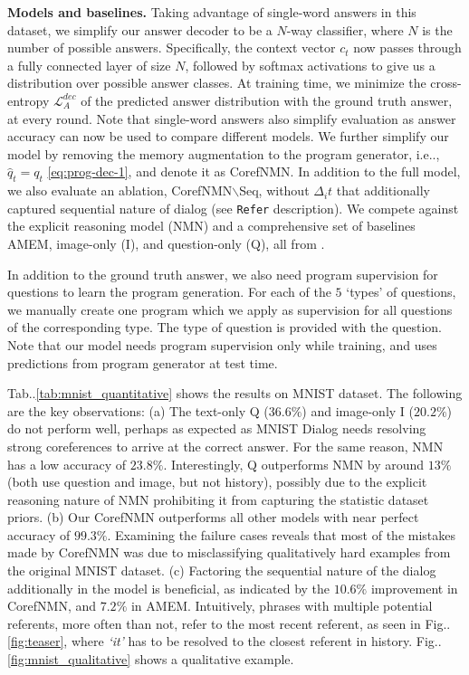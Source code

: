 \documentclass[runningheads]{llncs}
\makeatletter
\DeclareRobustCommand\onedot{\futurelet\@let@token\@onedot}
\def\@onedot{\ifx\@let@token.\else.\null\fi\xspace}
\def\ie{i.e\onedot} \def\Ie{I.e\onedot}
\def\Fig{Fig\onedot}
\def\Table{Tab\onedot}
\newcommand{\nmn}{CorefNMN\xspace}
\newcommand{\myparagraph}[1]{\vspace{0pt}\noindent{\bf #1}}
\makeatother
\begin{document}
\noindent
\textbf{Models and baselines.}
Taking advantage of single-word answers in this dataset, 
we simplify our answer decoder to be a $N$-way classifier, where $N$ is the number of possible answers.
Specifically, the context vector $c_t$ now passes through
a fully connected layer of size $N$, followed by softmax activations to give
us a distribution over possible answer classes.
At training time, we minimize the cross-entropy $\mathcal{L}_A^{dec}$ of the 
predicted answer distribution with the ground truth answer, at every round.
Note that single-word answers also simplify evaluation as answer accuracy can 
now be used to compare different models.
We further simplify our model by removing the memory augmentation to the
program generator, \ie, $\hat{q}_t = q_t$ \eqref{eq:prog-dec-1}, and denote it
as \nmn.
In addition to the full model, we also evaluate an ablation, 
\nmn{}$\backslash$Seq, without $\Delta_i t$ that additionally captured 
sequential nature of dialog (see \texttt{Refer} description).
We compete against the explicit reasoning model (NMN) \cite{hu2017learning} and
a comprehensive set of baselines AMEM, image-only (I), and question-only (Q), 
all from \cite{paul2017visual}.


\myparagraph{Supervision.}
In addition to the ground truth answer, we also need program supervision for 
questions to learn the program generation.
For each of the $5$ `types' of  questions, we manually create one program which
we apply as supervision for all questions of the corresponding type.
The type of question is provided with the question.
Note that our model needs program supervision only while training, and uses
predictions from program generator at test time.




\myparagraph{Results.}
\Table\ref{tab:mnist_quantitative} shows the results on MNIST dataset.
The following are the key observations:
(a) The text-only Q ($36.6\%$) and image-only I ($20.2\%$) do not perform well,
perhaps as expected as MNIST Dialog needs resolving strong coreferences to 
arrive at the correct answer.
For the same reason, NMN \cite{hu2017learning} has a low accuracy of $23.8\%$.
Interestingly, Q outperforms NMN by around $13\%$ (both use question and image,
but not history), possibly due to the explicit reasoning nature of NMN 
prohibiting it from capturing the statistic dataset priors.
(b) Our \nmn outperforms all other models with near perfect accuracy of $99.3\%$.
Examining the failure cases reveals that most of the mistakes made by \nmn was
due to misclassifying qualitatively hard examples from the original MNIST 
dataset.
(c) Factoring the sequential nature of the dialog additionally in the model is
beneficial, as indicated by the $10.6\%$ improvement in \nmn, and $7.2\%$ in
AMEM.
Intuitively, phrases with multiple potential referents, more often
than not, refer to the most recent referent, as seen in \Fig\ref{fig:teaser}, 
where \textit{`it'} has to be resolved to the closest referent in history.
\Fig\ref{fig:mnist_qualitative} shows a qualitative example.
\end{document}
